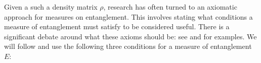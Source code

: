 





Given a such a density matrix $\rho$, research has often turned to an axiomatic approach for measures on entanglement. This involves stating what conditions a measure of entanglement must satisfy to be considered useful. There is a significant debate around what these axioms should be: see \cite{vedral_quantification} and \cite{plenio_negativity} for examples. We will follow \cite{paola_phd} and use the following three conditions for a measure of entanglement $E$:

